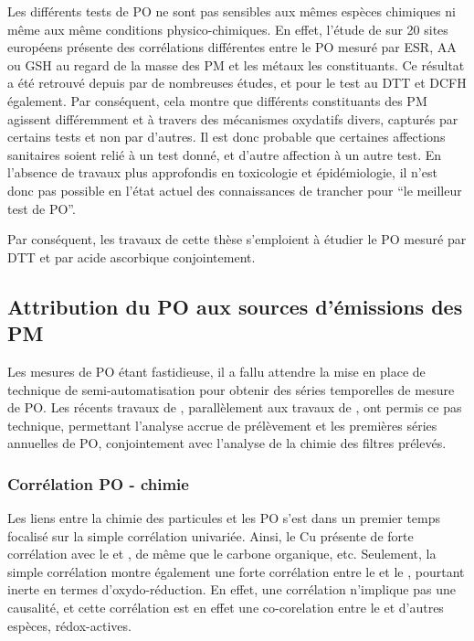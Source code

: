 Les différents tests de PO ne sont pas sensibles aux mêmes espèces chimiques ni même aux même
conditions physico-chimiques. En effet, l'étude de \cite{kunzliComparison2006} sur 20
sites européens présente des corrélations différentes entre le PO mesuré par ESR, AA ou
GSH au regard de la masse des PM et les métaux les constituants.
Ce résultat a été retrouvé depuis par de nombreuses études, et pour le test au DTT et DCFH
également. Par conséquent, cela montre que différents constituants des PM agissent
différemment et à travers des mécanismes oxydatifs divers, capturés par certains tests et
non par d'autres.
Il est donc probable que certaines affections sanitaires soient relié à un test donné, et
d'autre affection à un autre test. En l'absence de travaux plus approfondis en toxicologie
et épidémiologie, il n'est donc pas possible en l'état actuel des connaissances de trancher
pour ``le meilleur test de PO''.

Par conséquent, les travaux de cette thèse s'emploient à étudier le PO mesuré par DTT et
par acide ascorbique conjointement.


\subsection{Attribution du PO aux sources d'émissions des PM}%
\label{sub:attribution_du_po_aux_sources_d_émissions_des_pm}

Les mesures de PO étant fastidieuse, il a fallu attendre la mise en place de technique
de semi-automatisation pour obtenir des séries temporelles de mesure de PO. Les récents
travaux de \cite{fangSemiautomated2015}, parallèlement aux travaux de
\cite{calasPollution2017}, ont permis ce pas technique, permettant l'analyse accrue de
prélèvement et les premières séries annuelles de PO, conjointement avec l'analyse de la
chimie des filtres prélevés.

\subsubsection{Corrélation PO - chimie}%
\label{ssub:corrélation_po_chimie}

Les liens entre la chimie des particules et les PO s'est dans un premier temps focalisé
sur la simple corrélation univariée. Ainsi, le Cu présente de forte corrélation
avec le \PODTT{} et \POAA, de même que le carbone organique, etc. Seulement, la simple
corrélation montre également une forte corrélation entre le \PODTT{} et le ,
pourtant inerte en termes d'oxydo-réduction.
En effet, une corrélation n'implique pas une causalité, et cette corrélation est en effet
une co-corelation entre le  et d'autres espèces, rédox-actives.

